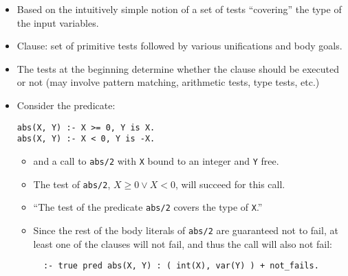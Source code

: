 \documentclass{article}
\def\dis{\vee}
\renewcommand{\_}{\char'137}
\begin{document}
\begin{itemize}
\item Based on the intuitively simple notion of a set of tests
      ``covering'' the type  of the input variables.


\item Clause: set of primitive tests followed by various
unifications and body goals.

\item The tests at the beginning determine whether the clause
should be executed or not (may involve pattern
matching, arithmetic tests, type tests, etc.)

\item Consider the predicate:
\begin{verbatim}
abs(X, Y) :- X >= 0, Y is X.
abs(X, Y) :- X < 0, Y is -X.
\end{verbatim} 
%
%
\begin{itemize}
\item and a call to \verb+abs/2+ with \verb+X+ bound to an integer
      and \verb+Y+ free.

\item The test of \verb+abs/2+, $X \geq 0 \dis X < 0$, will
      succeed for this call.


\item ``The test of the predicate \verb+abs/2+ covers the type of
      \verb+X+.''

\item Since the rest of the body literals of \verb+abs/2+ are
      guaranteed not to fail, at least one of the clauses will not
      fail, and thus the call will also not fail:

\begin{verbatim}
  :- true pred abs(X, Y) : ( int(X), var(Y) ) + not_fails.
\end{verbatim} 


\end{itemize}

\end{itemize}
\end{document}
